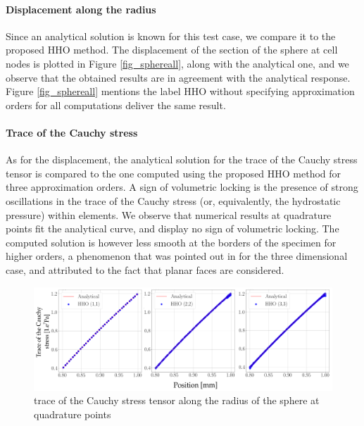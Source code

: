 \paragraph{Displacement along the radius}

Since an analytical solution is known for this test case, we compare it to the proposed HHO method. The displacement of the section of the sphere at cell nodes
is plotted in Figure \ref{fig_sphereall}, along with the analytical one, and we observe that the obtained results are in agreement with the analytical response.
Figure \ref{fig_sphereall} mentions the label HHO without specifying approximation orders for all computations deliver the same result.

\paragraph{Trace of the Cauchy stress}

As for the displacement, the analytical solution for the trace of the Cauchy stress tensor is compared to the one computed using the proposed HHO method for three approximation orders.
A sign of volumetric locking is the presence of strong oscillations in the trace of the Cauchy stress (or, equivalently, the hydrostatic pressure) within elements.
We observe that numerical results at quadrature points fit the analytical curve, and display no sign of volumetric locking. The computed solution is however less smooth
at the borders of the specimen for higher orders, a phenomenon that was pointed out in \cite{abbas_hybrid_2019-1} for the three dimensional case, and attributed to the fact that planar faces are considered.

\begin{figure}[H]
    \centering
    \includegraphics[width=15.cm]{img_calcs/sphere_pressures.png}
    \caption{trace of the Cauchy stress tensor along the radius of the sphere at quadrature points}
    \label{fig_sphere_pressure}
\end{figure}

